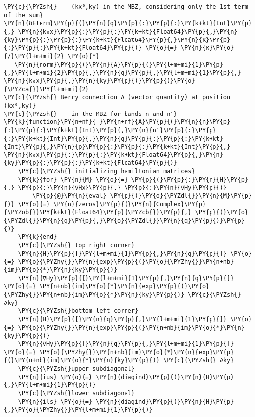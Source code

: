 \begin{Verbatim}[commandchars=\\\{\}]
\PY{c}{\PYZsh{}    (kx⁰,ky) in the MBZ, considering only the 1st term of the sum}
\PY{n}{δEterm}\PY{p}{(}\PY{n}{q}\PY{p}{:}\PY{p}{:}\PY{k+kt}{Int}\PY{p}{,} \PY{n}{k₀x}\PY{p}{:}\PY{p}{:}\PY{k+kt}{Float64}\PY{p}{,}\PY{n}{ky}\PY{p}{:}\PY{p}{:}\PY{k+kt}{Float64}\PY{p}{,}\PY{n}{κ}\PY{p}{:}\PY{p}{:}\PY{k+kt}{Float64}\PY{p}{)} \PY{o}{=} \PY{n}{κ}\PY{o}{/}\PY{l+m+mi}{2} \PY{o}{*}
   \PY{n}{norm}\PY{p}{(}\PY{n}{A}\PY{p}{(}\PY{l+m+mi}{1}\PY{p}{,}\PY{l+m+mi}{2}\PY{p}{,}\PY{n}{q}\PY{p}{,}\PY{l+m+mi}{1}\PY{p}{,} \PY{n}{k₀x}\PY{p}{,}\PY{n}{ky}\PY{p}{)}\PY{p}{)}\PY{o}{\PYZca{}}\PY{l+m+mi}{2}
\PY{c}{\PYZsh{} Berry connection A (vector quantity) at position (kx⁰,ky)}
\PY{c}{\PYZsh{}    in the MBZ for bands n and n′}
\PY{k}{function}\PY{n+nf}{ }\PY{n+nf}{A}\PY{p}{(}\PY{n}{n}\PY{p}{:}\PY{p}{:}\PY{k+kt}{Int}\PY{p}{,}\PY{n}{n′}\PY{p}{:}\PY{p}{:}\PY{k+kt}{Int}\PY{p}{,}\PY{n}{q}\PY{p}{:}\PY{p}{:}\PY{k+kt}{Int}\PY{p}{,}\PY{n}{p}\PY{p}{:}\PY{p}{:}\PY{k+kt}{Int}\PY{p}{,} \PY{n}{k₀x}\PY{p}{:}\PY{p}{:}\PY{k+kt}{Float64}\PY{p}{,}\PY{n}{ky}\PY{p}{:}\PY{p}{:}\PY{k+kt}{Float64}\PY{p}{)}
    \PY{c}{\PYZsh{} initializing hamiltonian matrices}
    \PY{k}{for} \PY{n}{M} \PY{o}{=} \PY{p}{(}\PY{p}{:}\PY{n}{H}\PY{p}{,} \PY{p}{:}\PY{n}{∇Hx}\PY{p}{,} \PY{p}{:}\PY{n}{∇Hy}\PY{p}{)}
        \PY{p}{@}\PY{n}{eval} \PY{p}{(}\PY{o}{\PYZdl{}}\PY{n}{M}\PY{p}{)} \PY{o}{=} \PY{n}{zeros}\PY{p}{(}\PY{n}{Complex}\PY{p}{\PYZob{}}\PY{k+kt}{Float64}\PY{p}{\PYZcb{}}\PY{p}{,} \PY{p}{(}\PY{o}{\PYZdl{}}\PY{n}{q}\PY{p}{,}\PY{o}{\PYZdl{}}\PY{n}{q}\PY{p}{)}\PY{p}{)}
    \PY{k}{end}
    \PY{c}{\PYZsh{} top right corner}
    \PY{n}{H}\PY{p}{[}\PY{l+m+mi}{1}\PY{p}{,}\PY{n}{q}\PY{p}{]} \PY{o}{=} \PY{o}{\PYZhy{}}\PY{n}{exp}\PY{p}{(}\PY{o}{\PYZhy{}}\PY{n+nb}{im}\PY{o}{*}\PY{n}{ky}\PY{p}{)}
    \PY{n}{∇Hy}\PY{p}{[}\PY{l+m+mi}{1}\PY{p}{,}\PY{n}{q}\PY{p}{]} \PY{o}{=} \PY{n+nb}{im}\PY{o}{*}\PY{n}{exp}\PY{p}{(}\PY{o}{\PYZhy{}}\PY{n+nb}{im}\PY{o}{*}\PY{n}{ky}\PY{p}{)} \PY{c}{\PYZsh{} ∂ky}
    \PY{c}{\PYZsh{}bottom left corner}
    \PY{n}{H}\PY{p}{[}\PY{n}{q}\PY{p}{,}\PY{l+m+mi}{1}\PY{p}{]} \PY{o}{=} \PY{o}{\PYZhy{}}\PY{n}{exp}\PY{p}{(}\PY{n+nb}{im}\PY{o}{*}\PY{n}{ky}\PY{p}{)}
    \PY{n}{∇Hy}\PY{p}{[}\PY{n}{q}\PY{p}{,}\PY{l+m+mi}{1}\PY{p}{]} \PY{o}{=} \PY{o}{\PYZhy{}}\PY{n+nb}{im}\PY{o}{*}\PY{n}{exp}\PY{p}{(}\PY{n+nb}{im}\PY{o}{*}\PY{n}{ky}\PY{p}{)} \PY{c}{\PYZsh{} ∂ky}
    \PY{c}{\PYZsh{}upper subdiagonal}
    \PY{n}{ius} \PY{o}{=} \PY{n}{diagind}\PY{p}{(}\PY{n}{H}\PY{p}{,}\PY{l+m+mi}{1}\PY{p}{)}
    \PY{c}{\PYZsh{}lower subdiagonal}
    \PY{n}{ils} \PY{o}{=} \PY{n}{diagind}\PY{p}{(}\PY{n}{H}\PY{p}{,}\PY{o}{\PYZhy{}}\PY{l+m+mi}{1}\PY{p}{)}

\end{Verbatim}
